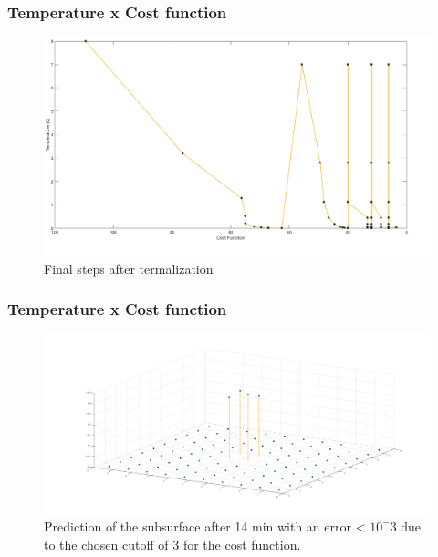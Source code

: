 \documentclass{beamer}
\begin{document}
\begin{frame}
\frametitle{Temperature x Cost function}
\begin{figure}[t!]
\begin{center}
\includegraphics[scale=.25]{./images/COST_TEMP.png}
\end{center}
\caption{Final steps after termalization}
\label{fluxo_calor}
\end{figure}
\end{frame}
\begin{frame}
\frametitle{Temperature x Cost function}
\begin{figure}[t!]
\begin{center}
\includegraphics[scale=.17]{./images/inversion.png}
\end{center}
\caption{Prediction of the subsurface after 14 min with an error < $10^-3$ due to the chosen cutoff of 3 for the cost function.}
\label{fluxo_calor}
\end{figure}
\end{frame}
\end{document}
